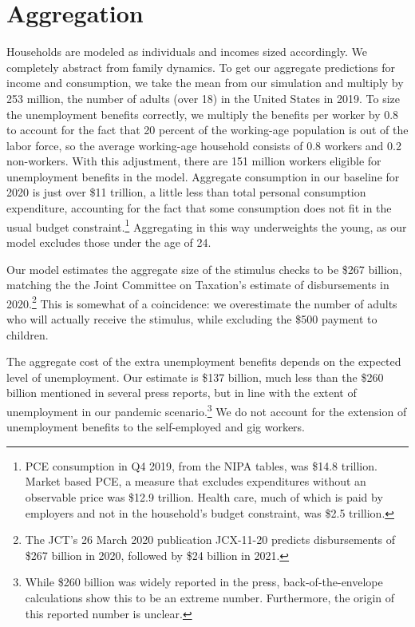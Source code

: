 \documentclass[./ConsumptionResponse]{subfiles}
\begin{document}
\section{Aggregation} \label{sec:aggregation}

Households are modeled as individuals and incomes sized accordingly.
We completely abstract from family dynamics.
To get our aggregate predictions for income and consumption, we take the mean from our simulation and multiply by 253 million, the number of adults (over 18) in the United States in 2019.
To size the unemployment benefits correctly, we multiply the benefits per worker by 0.8 to account for the fact that 20 percent of the working-age population is out of the labor force, so the average working-age household consists of 0.8 workers and 0.2 non-workers.
With this adjustment, there are 151 million workers eligible for unemployment benefits in the model.
Aggregate consumption in our baseline for 2020 is just over \$11 trillion, a little less than total personal consumption expenditure, accounting for the fact that some consumption does not fit in the usual budget constraint.\footnote{PCE consumption in Q4 2019, from the NIPA tables, was \$14.8 trillion. Market based PCE, a measure that excludes expenditures without an observable price was \$12.9 trillion. Health care, much of which is paid by employers and not in the household's budget constraint, was \$2.5 trillion.}
Aggregating in this way underweights the young, as our model excludes those under the age of 24.


Our model estimates the aggregate size of the stimulus checks to be \$267 billion, matching the the Joint Committee on Taxation's estimate of disbursements in 2020.\footnote{The JCT's 26 March 2020 publication JCX-11-20 predicts disbursements of \$267 billion in 2020, followed by \$24 billion in 2021.}
This is somewhat of a coincidence: we overestimate the number of adults who will actually receive the stimulus, while excluding the \$500 payment to children.

The aggregate cost of the extra unemployment benefits depends on the expected level of unemployment.
Our estimate is \$137 billion, much less than the \$260 billion mentioned in several press reports, but in line with the extent of unemployment in our pandemic scenario.\footnote{While \$260 billion was widely reported in the press, back-of-the-envelope calculations show this to be an extreme number. Furthermore, the origin of this reported number is unclear.} 
We do not account for the extension of unemployment benefits to the self-employed and gig workers.
\end{document}
